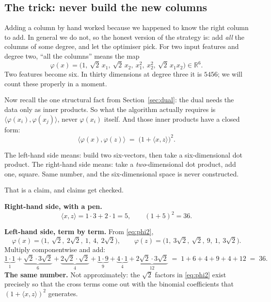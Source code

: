 \documentclass[11pt]{article}
\begin{document}
\subsection{The trick: never build the new columns}
\label{sec:kernelid}

Adding a column by hand worked because we happened to know the right column to
add. In general we do not, so the honest version of the strategy is: add
\emph{all} the columns of some degree, and let the optimiser pick. For two
input features and degree two, ``all the columns'' means the map
\begin{equation}
  \varphi(x) = \bigl(1,\ \sqrt2\,x_1,\ \sqrt2\,x_2,\
                  x_1^2,\ x_2^2,\ \sqrt2\,x_1x_2\bigr) \in \mathbb{R}^6 .
  \label{eq:phi2}
\end{equation}
Two features become six. In thirty dimensions at degree three it is $5456$; we
will count these properly in a moment.

Now recall the one structural fact from Section~\ref{sec:dual}: the dual needs
the data only as inner products. So what the algorithm actually requires is
$\langle \varphi(x_i), \varphi(x_j)\rangle$, never $\varphi(x_i)$ itself. And
those inner products have a closed form:
\begin{equation}
  \langle \varphi(x), \varphi(z)\rangle
  \;=\; \bigl(1 + \langle x, z\rangle\bigr)^2 .
  \label{eq:polyid}
\end{equation}

The left-hand side means: build two six-vectors, then take a six-dimensional
dot product. The right-hand side means: take a \emph{two}-dimensional dot
product, add one, square. Same number, and the six-dimensional space is never
constructed.

That is a claim, and claims get checked.

\begin{worked}[Verify \eqref{eq:polyid} at $x = (1,2)$, $z = (3,1)$]
\textbf{Right-hand side, with a pen.}
\[
  \langle x, z\rangle = 1\cdot3 + 2\cdot1 = 5,
  \qquad (1 + 5)^2 = 36 .
\]

\textbf{Left-hand side, term by term.} From \eqref{eq:phi2},
\[
  \varphi(x) = \bigl(1,\ \sqrt2,\ 2\sqrt2,\ 1,\ 4,\ 2\sqrt2\bigr),
  \qquad
  \varphi(z) = \bigl(1,\ 3\sqrt2,\ \sqrt2,\ 9,\ 1,\ 3\sqrt2\bigr).
\]
Multiply componentwise and add:
\[
  \underbrace{1\cdot1}_{1}
  + \underbrace{\sqrt2\cdot3\sqrt2}_{6}
  + \underbrace{2\sqrt2\cdot\sqrt2}_{4}
  + \underbrace{1\cdot9}_{9}
  + \underbrace{4\cdot1}_{4}
  + \underbrace{2\sqrt2\cdot3\sqrt2}_{12}
  \;=\; 1 + 6 + 4 + 9 + 4 + 12 \;=\; 36 .
\]
\textbf{The same number.} Not approximately: the $\sqrt2$ factors in
\eqref{eq:phi2} exist precisely so that the cross terms come out with the
binomial coefficients that $(1 + \langle x,z\rangle)^2$ generates.
\end{worked}
\end{document}
